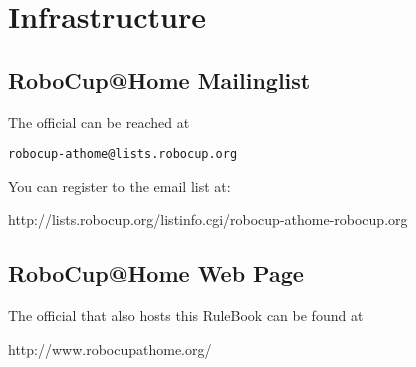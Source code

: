 \section{Infrastructure}
\label{sec:infrastructure}
\subsection{RoboCup@Home Mailinglist}
The official  can be reached at
\begin{center}
\texttt{robocup-athome@lists.robocup.org}
\end{center}
You can register to the email list at:
\begin{center}
http://lists.robocup.org/listinfo.cgi/robocup-athome-robocup.org
\end{center}

\subsection{RoboCup@Home Web Page}
The official  that also hosts this RuleBook can be found at \\
\begin{center}
http://www.robocupathome.org/
\end{center}

